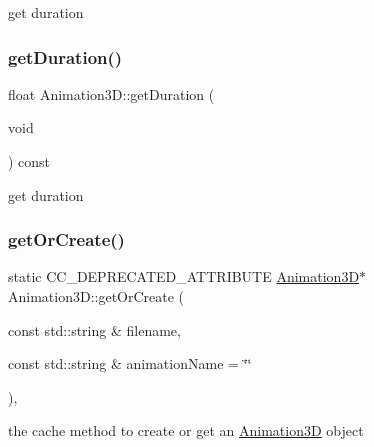 get duration \mbox{\label{classAnimation3D_a02900b51836629f58ceb1546beb3d8ae}} 
\subsubsection{\texorpdfstring{get\+Duration()}{getDuration()}\hspace{0.1cm}{\footnotesize\ttfamily [2/2]}}
{\footnotesize\ttfamily float Animation3\+D\+::get\+Duration (\begin{DoxyParamCaption}\item[{void}]{ }\end{DoxyParamCaption}) const\hspace{0.3cm}{\ttfamily [inline]}}

get duration \mbox{\label{classAnimation3D_af6fb0fdb968cd2a67b9e376e9a9d9b1d}} 
\subsubsection{\texorpdfstring{get\+Or\+Create()}{getOrCreate()}\hspace{0.1cm}{\footnotesize\ttfamily [1/2]}}
{\footnotesize\ttfamily static C\+C\+\_\+\+D\+E\+P\+R\+E\+C\+A\+T\+E\+D\+\_\+\+A\+T\+T\+R\+I\+B\+U\+TE \hyperlink{classAnimation3D}{Animation3D}$\ast$ Animation3\+D\+::get\+Or\+Create (\begin{DoxyParamCaption}\item[{const std\+::string \&}]{filename,  }\item[{const std\+::string \&}]{animation\+Name = {\ttfamily \char`\"{}\char`\"{}} }\end{DoxyParamCaption})\hspace{0.3cm}{\ttfamily [inline]}, {\ttfamily [static]}}

the cache method to create or get an \hyperlink{classAnimation3D}{Animation3D} object \mbox{\label{classAnimation3D_af6fb0fdb968cd2a67b9e376e9a9d9b1d}} 
